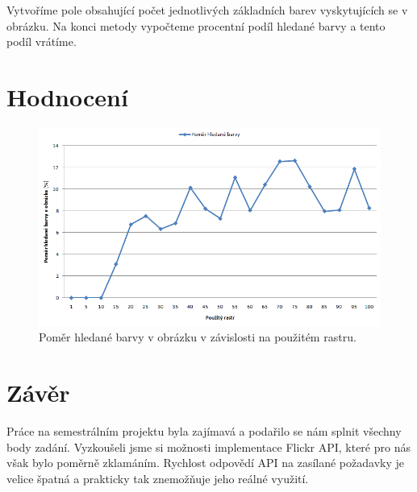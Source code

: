 \documentclass[12pt]{article}
\begin{document}
Vytvoříme pole obsahující počet jednotlivých základních barev vyskytujících se v obrázku. Na konci metody vypočteme procentní podíl hledané barvy a tento podíl vrátíme.

\section{Hodnocení}
\begin{figure}[ht]
\centering       
\includegraphics[scale=0.7]{graf.png}
\caption{Poměr hledané barvy v obrázku v závislosti na použitém rastru.}
\label{graf}
\end{figure}

\section{Závěr}
Práce na semestrálním projektu byla zajímavá a podařilo se nám splnit všechny body zadání. Vyzkoušeli jsme si možnosti implementace Flickr API, které pro nás však bylo poměrně zklamáním. Rychlost odpovědí API na zasílané požadavky je velice špatná a prakticky tak znemožňuje jeho reálné využití.
\end{document}
